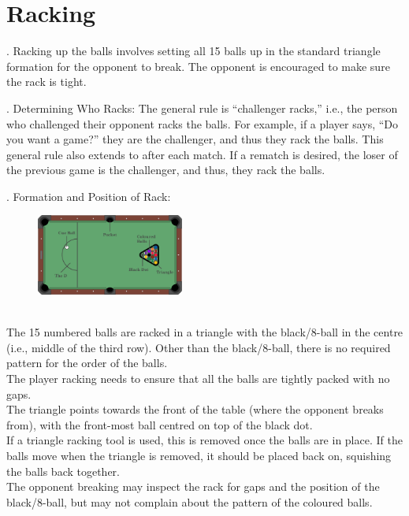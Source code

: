 \documentclass[a4paper, twocolumn]{article}
\newcommand{\fixedlabel}[1]{\textbf{\makebox[3.5em][l]{#1}}}
\newcommand{\itemspace}{\vspace{1.2mm}\\}
\begin{document}
\section{Racking} \label{racking}
\ex. Racking up the balls involves setting all 15 balls up in the standard triangle formation for the opponent to break. The opponent is encouraged to make sure the rack is tight.\par
\ex. \label{challengerracks}Determining Who Racks: The general rule is “challenger racks,” i.e., the person who challenged their opponent racks the balls. For example, if a player says, “Do you want a game?” they are the challenger, and thus they rack the balls. This general rule also extends to after each match. If a rematch is desired, the loser of the previous game is the challenger, and thus, they rack the balls.\par
\ex. \label{rackpos}Formation and Position of Rack:
    \begin{figure}[!h]
        \raggedleft
        \includegraphics[width=0.4315\textwidth]{images/table_diagram.png}
        \hspace{-1.7mm}
        \label{fig:f1}
    \end{figure}\\
\fixedlabel{2.3.1}The 15 numbered balls are racked in a triangle with the black/8-ball in the centre (i.e., middle of the third row). Other than the black/8-ball, there is no required pattern for the order of the balls.\itemspace
\fixedlabel{2.3.2}The player racking needs to ensure that all the balls are tightly packed with no gaps.\itemspace
\fixedlabel{2.3.3}The triangle points towards the front of the table (where the opponent breaks from), with the front-most ball centred on top of the black dot.\itemspace
\fixedlabel{2.3.4}If a triangle racking tool is used, this is removed once the balls are in place. If the balls move when the triangle is removed, it should be placed back on, squishing the balls back together.\itemspace
\fixedlabel{2.3.5}The opponent breaking may inspect the rack for gaps and the position of the black/8-ball, but may not complain about the pattern of the coloured balls.
\par
\end{document}
